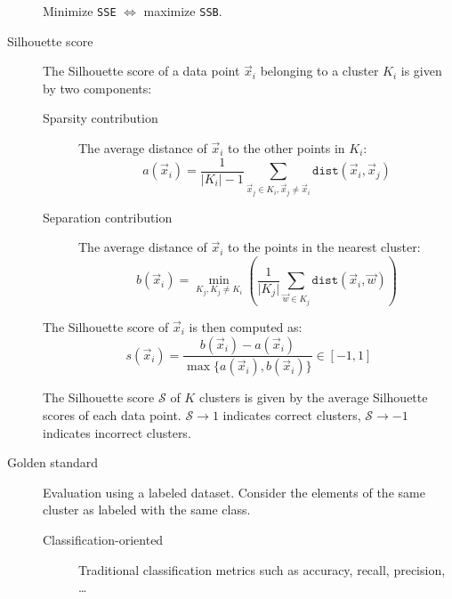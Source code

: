 \begin{description}
        \begin{theorem}
            Minimize \texttt{SSE} $\iff$ maximize \texttt{SSB}.
        \end{theorem}
        
    \item[Silhouette score] 
        The Silhouette score of a data point $\vec{x}_i$ belonging to a cluster $K_i$ is given by two components:
        \begin{description}
            \item[Sparsity contribution] 
                The average distance of $\vec{x}_i$ to the other points in $K_i$:
                \[ a(\vec{x}_i) = \frac{1}{\vert K_i \vert - 1} \sum_{\vec{x}_j \in K_i, \vec{x}_j \neq \vec{x}_i} \texttt{dist}(\vec{x}_i, \vec{x}_j) \]
            
            \item[Separation contribution] 
                The average distance of $\vec{x}_i$ to the points in the nearest cluster:
                \[ b(\vec{x}_i) = \min_{K_j, K_j \neq K_i} \left( \frac{1}{\vert K_j \vert} \sum_{\vec{w} \in K_j} \texttt{dist}(\vec{x}_i, \vec{w}) \right) \]
        \end{description}
        The Silhouette score of $\vec{x}_i$ is then computed as:
        \[ s(\vec{x}_i) = \frac{b(\vec{x}_i) - a(\vec{x}_i)}{\max\{ a(\vec{x}_i), b(\vec{x}_i) \}} \in [-1, 1] \]
        
        The Silhouette score $\mathcal{S}$ of $K$ clusters is given by the average Silhouette scores of each data point.
        $\mathcal{S} \rightarrow 1$ indicates correct clusters, $\mathcal{S} \rightarrow -1$ indicates incorrect clusters.

    \item[Golden standard] 
        Evaluation using a labeled dataset.
        Consider the elements of the same cluster as labeled with the same class.

        \begin{description}
            \item[Classification-oriented] 
                Traditional classification metrics such as accuracy, recall, precision, \dots


\end{description}
\end{description}
